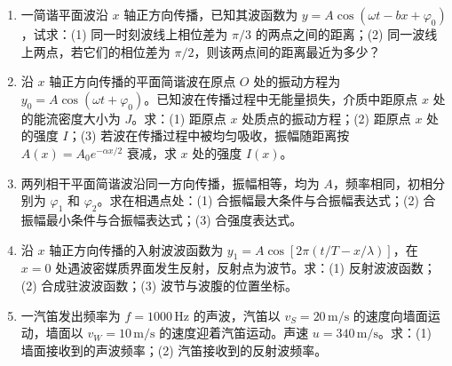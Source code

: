 \documentclass[12pt]{article}
\begin{document}
\begin{enumerate}[label=\textbf{例\arabic*.}, leftmargin=*]
\item 一简谐平面波沿 $x$ 轴正方向传播，已知其波函数为 $y=A\cos(\omega t - bx + \varphi_0)$，试求：(1) 同一时刻波线上相位差为 $\pi/3$ 的两点之间的距离；(2) 同一波线上两点，若它们的相位差为 $\pi/2$，则该两点间的距离最近为多少？

\item 沿 $x$ 轴正方向传播的平面简谐波在原点 $O$ 处的振动方程为 $y_0 = A\cos(\omega t + \varphi_0)$。已知波在传播过程中无能量损失，介质中距原点 $x$ 处的能流密度大小为 $J$。求：(1) 距原点 $x$ 处质点的振动方程；(2) 距原点 $x$ 处的强度 $I$；(3) 若波在传播过程中被均匀吸收，振幅随距离按 $A(x) = A_0 e^{-\alpha x/2}$ 衰减，求 $x$ 处的强度 $I(x)$。

\item 两列相干平面简谐波沿同一方向传播，振幅相等，均为 $A$，频率相同，初相分别为 $\varphi_1$ 和 $\varphi_2$。求在相遇点处：(1) 合振幅最大条件与合振幅表达式；(2) 合振幅最小条件与合振幅表达式；(3) 合强度表达式。

\item 沿 $x$ 轴正方向传播的入射波波函数为 $y_1 = A\cos[2\pi(t/T - x/\lambda)]$，在 $x=0$ 处遇波密媒质界面发生反射，反射点为波节。求：(1) 反射波波函数；(2) 合成驻波波函数；(3) 波节与波腹的位置坐标。

\item 一汽笛发出频率为 $f=1000\,\mathrm{Hz}$ 的声波，汽笛以 $v_S=20\,\mathrm{m/s}$ 的速度向墙面运动，墙面以 $v_W=10\,\mathrm{m/s}$ 的速度迎着汽笛运动。声速 $u=340\,\mathrm{m/s}$。求：(1) 墙面接收到的声波频率；(2) 汽笛接收到的反射波频率。

\end{enumerate}
\end{document}
